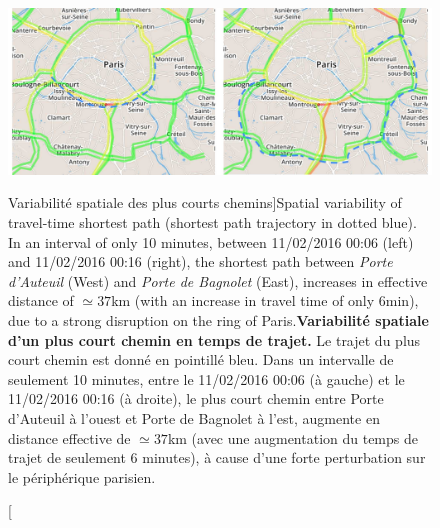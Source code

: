 \begin{figure}
\includegraphics[width=\linewidth]{Figures/Final/8-1-2-fig-transportationequilibrium-fig-2.jpg}
\caption[Spatial variability of shortest paths][Variabilité spatiale des plus courts chemins]{Spatial variability of travel-time shortest path (shortest path trajectory in dotted blue). In an interval of only 10 minutes, between 11/02/2016 00:06 (left) and 11/02/2016 00:16 (right), the shortest path between \emph{Porte d'Auteuil} (West) and \emph{Porte de Bagnolet} (East), increases in effective distance of $\simeq 37$km (with an increase in travel time of only 6min), due to a strong disruption on the ring of Paris.\label{fig:fig-2}}{\textbf{Variabilité spatiale d'un plus court chemin en temps de trajet.} Le trajet du plus court chemin est donné en pointillé bleu. Dans un intervalle de seulement 10 minutes, entre le 11/02/2016 00:06 (à gauche) et le 11/02/2016 00:16 (à droite), le plus court chemin entre Porte d'Auteuil à l'ouest et Porte de Bagnolet à l'est, augmente en distance effective de $\simeq 37$km (avec une augmentation du temps de trajet de seulement 6 minutes), à cause d'une forte perturbation sur le périphérique parisien.\label{fig:transportationequilibrium:fig-2}}
\end{figure}



